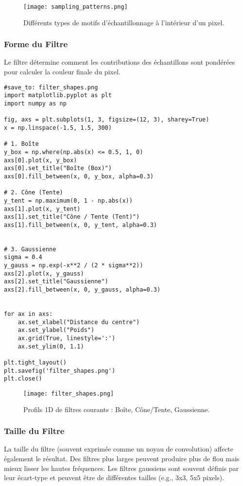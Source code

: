 \documentclass{article}
\begin{document}
\begin{figure}[H]
\centering
\texttt{[image: sampling\_patterns.png]}
\caption{Différents types de motifs d'échantillonnage à l'intérieur d'un pixel.}
\label{fig:sampling_patterns}
\end{figure}

\subsubsection{Forme du Filtre}
Le filtre détermine comment les contributions des échantillons sont pondérées pour calculer la couleur finale du pixel.

\begin{verbatim}
#save_to: filter_shapes.png
import matplotlib.pyplot as plt
import numpy as np

fig, axs = plt.subplots(1, 3, figsize=(12, 3), sharey=True)
x = np.linspace(-1.5, 1.5, 300)

# 1. Boîte
y_box = np.where(np.abs(x) <= 0.5, 1, 0)
axs[0].plot(x, y_box)
axs[0].set_title("Boîte (Box)")
axs[0].fill_between(x, 0, y_box, alpha=0.3)

# 2. Cône (Tente)
y_tent = np.maximum(0, 1 - np.abs(x))
axs[1].plot(x, y_tent)
axs[1].set_title("Cône / Tente (Tent)")
axs[1].fill_between(x, 0, y_tent, alpha=0.3)


# 3. Gaussienne
sigma = 0.4
y_gauss = np.exp(-x**2 / (2 * sigma**2))
axs[2].plot(x, y_gauss)
axs[2].set_title("Gaussienne")
axs[2].fill_between(x, 0, y_gauss, alpha=0.3)


for ax in axs:
    ax.set_xlabel("Distance du centre")
    ax.set_ylabel("Poids")
    ax.grid(True, linestyle=':')
    ax.set_ylim(0, 1.1)

plt.tight_layout()
plt.savefig('filter_shapes.png')
plt.close()
\end{verbatim}

\begin{figure}[H]
\centering
\texttt{[image: filter\_shapes.png]}
\caption{Profils 1D de filtres courants : Boîte, Cône/Tente, Gaussienne.}
\label{fig:filter_shapes}
\end{figure}

\subsubsection{Taille du Filtre}
La taille du filtre (souvent exprimée comme un noyau de convolution) affecte également le résultat. Des filtres plus larges peuvent produire plus de flou mais mieux lisser les hautes fréquences. Les filtres gaussiens sont souvent définis par leur écart-type et peuvent être de différentes tailles (e.g., 3x3, 5x5 pixels).
\end{document}

